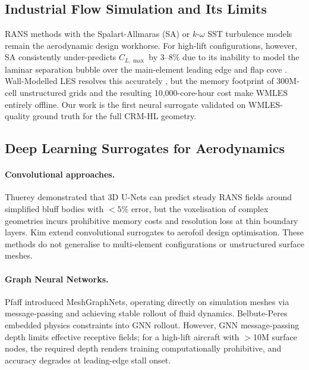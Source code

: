 \documentclass[10pt,twocolumn,letterpaper]{article}
\begin{document}
\subsection{Industrial Flow Simulation and Its Limits}
\label{subsec:rans_cfd}

RANS methods with the Spalart-Allmaras (SA)
\cite{Spalart1992SA} or $k$-$\omega$ SST
\cite{Menter1994SST} turbulence models remain the aerodynamic
design workhorse. For high-lift configurations, however, SA
consistently under-predicts $C_{L,\max}$ by $3$--$8\%$ due to its
inability to model the laminar separation bubble over the main-element
leading edge and flap cove \cite{Rumsey2001HighLift}. 
Wall-Modelled LES resolves this accurately \cite{Bodart2013WMLES},
but the memory footprint of 300M-cell unstructured grids and the
resulting 10,000-core-hour cost make WMLES entirely offline.
Our work is the first neural surrogate validated on WMLES-quality
ground truth for the full CRM-HL geometry.

\subsection{Deep Learning Surrogates for Aerodynamics}
\label{subsec:dl_surrogates}

\paragraph{Convolutional approaches.}
Thuerey \etal \cite{Thuerey2020Deep3DFlow} demonstrated that
3D U-Nets can predict steady RANS fields around simplified bluff bodies
with $<5\%$ error, but the voxelisation of complex geometries incurs
prohibitive memory costs and resolution loss at thin boundary layers.
Kim \etal \cite{Kim2019Deep} extend convolutional surrogates to
aerofoil design optimisation. These methods do not generalise to
multi-element configurations or unstructured surface meshes.

\paragraph{Graph Neural Networks.}
Pfaff \etal \cite{Pfaff2021MeshGraphNets} introduced MeshGraphNets,
operating directly on simulation meshes via message-passing and
achieving stable rollout of fluid dynamics. Belbute-Peres \etal
\cite{Belbute-Peres2020Combining} embedded physics constraints into
GNN rollout. However, GNN message-passing depth limits effective
receptive fields; for a high-lift aircraft with $>$10M surface
nodes, the required depth renders training computationally prohibitive,
and accuracy degrades at leading-edge stall onset.
\end{document}
